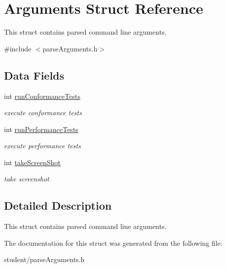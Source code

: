 \hypertarget{structArguments}{}\section{Arguments Struct Reference}
\label{structArguments}


This struct contains parsed command line arguments.  




{\ttfamily \#include $<$parse\+Arguments.\+h$>$}

\subsection*{Data Fields}
\begin{DoxyCompactItemize}
\item 
\mbox{\label{structArguments_a6bc787170da38be26e99235d6f8183f9}} 
int \hyperlink{structArguments_a6bc787170da38be26e99235d6f8183f9}{run\+Conformance\+Tests}
\begin{DoxyCompactList}\small\item\em execute conformance tests \end{DoxyCompactList}\item 
\mbox{\label{structArguments_a6b9b90f2db5d9b1feb0cf9ca6e6b3a18}} 
int \hyperlink{structArguments_a6b9b90f2db5d9b1feb0cf9ca6e6b3a18}{run\+Performance\+Tests}
\begin{DoxyCompactList}\small\item\em execute performance tests \end{DoxyCompactList}\item 
\mbox{\label{structArguments_aa5763070ed323e09f16efd294aa0315a}} 
int \hyperlink{structArguments_aa5763070ed323e09f16efd294aa0315a}{take\+Screen\+Shot}
\begin{DoxyCompactList}\small\item\em take screenshot \end{DoxyCompactList}\end{DoxyCompactItemize}


\subsection{Detailed Description}
This struct contains parsed command line arguments. 

The documentation for this struct was generated from the following file\+:\begin{DoxyCompactItemize}
\item 
student/parse\+Arguments.\+h\end{DoxyCompactItemize}

